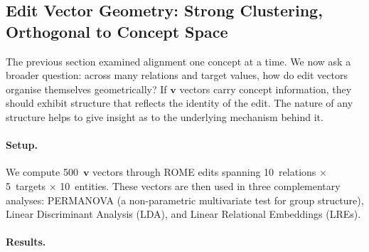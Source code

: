 \documentclass[11pt,a4paper]{article}
\newcommand{\vv}{\mathbf{v}}
\newcommand{\abs}[1]{\lvert #1 \rvert}
\newcommand{\cosim}{\abs{\cos(\cdot,\cdot)}}
\begin{document}
\subsection{Edit Vector Geometry: Strong Clustering, Orthogonal to Concept Space}
\label{sec:exp2}


The previous section examined alignment one concept at a time. We now ask a broader question: across many relations and target values, how do edit vectors organise themselves geometrically? If $\vv$ vectors carry concept information, they should exhibit structure that reflects the identity of the edit. The nature of any structure helps to give insight as to the underlying mechanism behind it. 

\paragraph{Setup.} We compute 500~$\vv$ vectors through ROME edits spanning 10~relations $\times$ 5~targets $\times$ 10~entities. These vectors are then used in three complementary analyses: PERMANOVA (a non-parametric multivariate test for group structure), Linear Discriminant Analysis (LDA), and Linear Relational Embeddings (LREs).

\paragraph{Results.}
\end{document}
